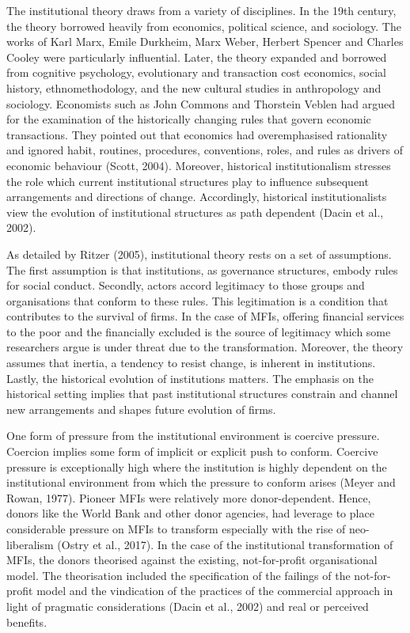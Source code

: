 \documentclass[a4paper, nobind]{templates/ociamthesis}
\begin{document}
The institutional theory draws from a variety of disciplines. In the 19th century, the theory borrowed heavily from economics, political science, and sociology. The works of Karl Marx, Emile Durkheim, Marx Weber, Herbert Spencer and Charles Cooley were particularly influential. Later, the theory expanded and borrowed from cognitive psychology, evolutionary and transaction cost economics, social history, ethnomethodology, and the new cultural studies in anthropology and sociology. Economists such as John Commons and Thorstein Veblen had argued for the examination of the historically changing rules that govern economic transactions. They pointed out that economics had overemphasised rationality and ignored habit, routines, procedures, conventions, roles, and rules as drivers of economic behaviour (Scott, 2004). Moreover, historical institutionalism stresses the role which current institutional structures play to influence subsequent arrangements and directions of change. Accordingly, historical institutionalists view the evolution of institutional structures as path dependent (Dacin et al., 2002).

As detailed by Ritzer (2005), institutional theory rests on a set of assumptions. The first assumption is that institutions, as governance structures, embody rules for social conduct. Secondly, actors accord legitimacy to those groups and organisations that conform to these rules. This legitimation is a condition that contributes to the survival of firms. In the case of MFIs, offering financial services to the poor and the financially excluded is the source of legitimacy which some researchers argue is under threat due to the transformation. Moreover, the theory assumes that inertia, a tendency to resist change, is inherent in institutions. Lastly, the historical evolution of institutions matters. The emphasis on the historical setting implies that past institutional structures constrain and channel new arrangements and shapes future evolution of firms.

One form of pressure from the institutional environment is coercive pressure. Coercion implies some form of implicit or explicit push to conform. Coercive pressure is exceptionally high where the institution is highly dependent on the institutional environment from which the pressure to conform arises (Meyer and Rowan, 1977). Pioneer MFIs were relatively more donor-dependent. Hence, donors like the World Bank and other donor agencies, had leverage to place considerable pressure on MFIs to transform especially with the rise of neo-liberalism (Ostry et al., 2017). In the case of the institutional transformation of MFIs, the donors theorised against the existing, not-for-profit organisational model. The theorisation included the specification of the failings of the not-for-profit model and the vindication of the practices of the commercial approach in light of pragmatic considerations (Dacin et al., 2002) and real or perceived benefits.
\end{document}
